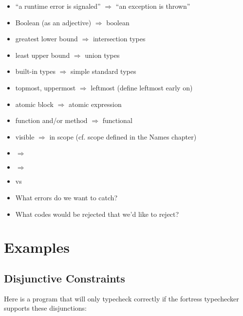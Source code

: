 \begin{itemize}
  \item ``a runtime error is signaled'' $\Rightarrow$ ``an exception is thrown''
  \item Boolean (as an adjective) $\Rightarrow$ boolean
  \item greatest lower bound $\Rightarrow$ intersection types
  \item least upper bound $\Rightarrow$ union types
  \item built-in types $\Rightarrow$ simple standard types
  \item topmost, uppermost $\Rightarrow$ leftmost (define leftmost early on)
  \item atomic block $\Rightarrow$ atomic expression
  \item function and/or method $\Rightarrow$ functional
  \item visible $\Rightarrow$ in scope (cf. scope defined in the Names chapter)
  \item {} $\Rightarrow$ 
  \item {} $\Rightarrow$ 
  \item {} vs 
  \item What errors do we want to catch?
  \item What codes would be rejected that we'd like to reject?
\end{itemize}


\section{Examples}
\subsection{Disjunctive Constraints}

Here is a program that will only typecheck correctly if the fortress typechecker supports these disjunctions:







